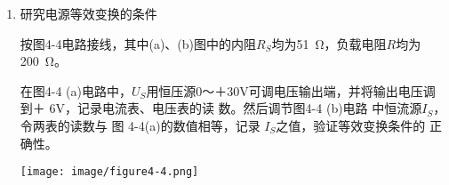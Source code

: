 \documentclass[UTF8]{article}
\begin{document}
\begin{enumerate}[label=\textbf{\arabic*}.]
                \begin{adjustwidth}{0em}{0em}
                    \begin{minipage}[H]{0.4\textwidth}
                        \raggedright
                        \noindent\hspace{2em}按图4-3接线，图中$I_S$为恒流源，调节其输出为5mA（用
                        毫安表测量），$R_2$取\SI{470}{\ohm}的电位器，在$R_S$分别为\SI{1}{k\ohm}和$\infty$两
                        种情况下，调节电位器$R_2$，令其阻值由大至小变化，将电流表、
                        电压表的读数记入自拟的数据表格中。
                    \end{minipage}
                    \begin{minipage}[H]{0.5\textwidth}
                        \centering
                        \texttt{[image: image/figure4-3.png]}
                    \end{minipage}
                \end{adjustwidth}
                \item 研究电源等效变换的条件
                \par
                \noindent\hspace{2em}按图4-4电路接线，其中(a)、(b)图中的内阻$R_S$均为\SI{51}{\ohm}，负载电阻$R$均为\SI{200}{\ohm}。 
                \begin{adjustwidth}{0em}{0em}
                    \begin{minipage}[H]{0.4\textwidth}
                        \raggedright
                        \noindent\hspace{2em} 在图4-4 (a)电路中，$U_S$用恒压源0～＋30V可调电压输出端，并将输出电压调到＋
                        6V，记录电流表、电压表的读
                        数。然后调节图4-4 (b)电路
                        中恒流源$I_S$，令两表的读数与
                        图 4-4(a)的数值相等，记录
                        $I_S$之值，验证等效变换条件的
                        正确性。
                    \end{minipage}
                    \begin{minipage}[H]{0.5\textwidth}
                        \centering
                        \texttt{[image: image/figure4-4.png]}
                    \end{minipage}
                \end{adjustwidth}
 
            \end{enumerate}
\end{document}
